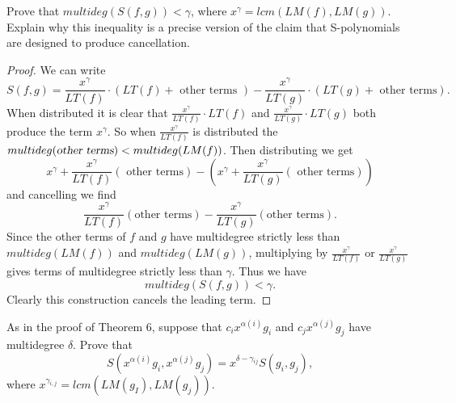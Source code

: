 \begin{tcolorbox}[title=Problem 7, breakable]
    Prove that $multideg(S(f, g)) < \gamma$, where $x^\gamma = lcm(LM(f), LM(g))$.
    Explain why this inequality is a precise version of the claim that S-polynomials 
    are designed to produce cancellation.
\end{tcolorbox}


\begin{proof}
    We can write 
    \[
    S(f, g) = \frac{x^\gamma}{LT(f)} \cdot \left(LT(f) + \text{ other terms }\right) 
             - \frac{x^\gamma}{LT(g)} \cdot \left(LT(g) + \text{ other terms}\right).
    \]
    When distributed it is clear that $\frac{x^\gamma}{LT(f)} \cdot LT(f)$ and 
    $\frac{x^\gamma}{LT(g)} \cdot LT(g)$ both produce the term $x^\gamma$.
    So when $\frac{x^\gamma}{LT(f)}$ is distributed the $multideg(\textsl{other terms}) < multideg(LM(f))$.
    Then distributing we get 
    \[
    x^\gamma + \frac{x^\gamma}{LT(f)}\left(\text{ other terms}\right) 
    - \left(x^\gamma + \frac{x^\gamma}{LT(g)}\left(\text{ other terms}\right)\right)
    \]
    and cancelling we find 
    \[
    \frac{x^\gamma}{LT(f)}\left(\text{other terms}\right) 
    - \frac{x^\gamma}{LT(g)}\left(\text{other terms}\right).
    \]
    Since the other terms of $f$ and $g$ have multidegree strictly less than 
    $multideg(LM(f))$ and $multideg(LM(g))$, multiplying by 
    $\frac{x^\gamma}{LT(f)}$ or $\frac{x^\gamma}{LT(g)}$ gives terms of multidegree strictly less than $\gamma$.
    Thus we have 
    \[
    multideg(S(f, g)) < \gamma.
    \]
    Clearly this construction cancels the leading term.
\end{proof}


\begin{tcolorbox}[title=Problem 8, breakable]
    As in the proof of Theorem 6, suppose that 
    $c_i x^{\alpha(i)} g_i$ and $c_j x^{\alpha(j)} g_j$ have multidegree $\delta$.
    Prove that 
    \[S(x^{\alpha(i)} g_i, x^{\alpha (j)} g_j) = x^{\delta  - \gamma_{i j}} S(g_i, g_j),\]
    where $x^{\gamma_{i, j}} = lcm(LM(g_I), LM(g_j))$.
\end{tcolorbox}

